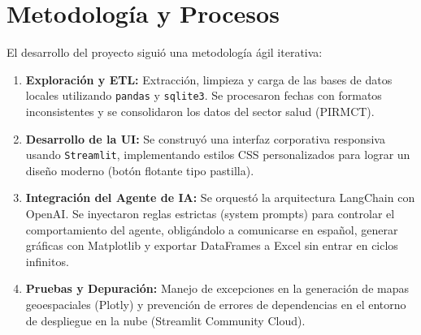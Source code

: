 \documentclass[12pt,a4paper]{article}
\begin{document}
\vspace{0.5cm}
\begin{center}
\end{center}


\newpage


\section{Metodología y Procesos}
El desarrollo del proyecto siguió una metodología ágil iterativa:
\begin{enumerate}
    \item \textbf{Exploración y ETL:} Extracción, limpieza y carga de las bases de datos locales utilizando \texttt{pandas} y \texttt{sqlite3}. Se procesaron fechas con formatos inconsistentes y se consolidaron los datos del sector salud (PIRMCT).
    \item \textbf{Desarrollo de la UI:} Se construyó una interfaz corporativa responsiva usando \texttt{Streamlit}, implementando estilos CSS personalizados para lograr un diseño moderno (botón flotante tipo pastilla).
    \item \textbf{Integración del Agente de IA:} Se orquestó la arquitectura LangChain con OpenAI. Se inyectaron reglas estrictas (system prompts) para controlar el comportamiento del agente, obligándolo a comunicarse en español, generar gráficas con Matplotlib y exportar DataFrames a Excel sin entrar en ciclos infinitos.
    \item \textbf{Pruebas y Depuración:} Manejo de excepciones en la generación de mapas geoespaciales (Plotly) y prevención de errores de dependencias en el entorno de despliegue en la nube (Streamlit Community Cloud).
\end{enumerate}
\end{document}

